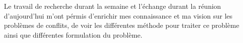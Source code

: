 
    \item Le travail de recherche durant la semaine et l'échange durant la réunion d'aujourd'hui m'ont pérmis d'enrichir mes connaissance et ma vision sur les problèmes de conflits, de voir les différentes méthode pour traiter ce problème ainsi que différentes formulation du problème.
